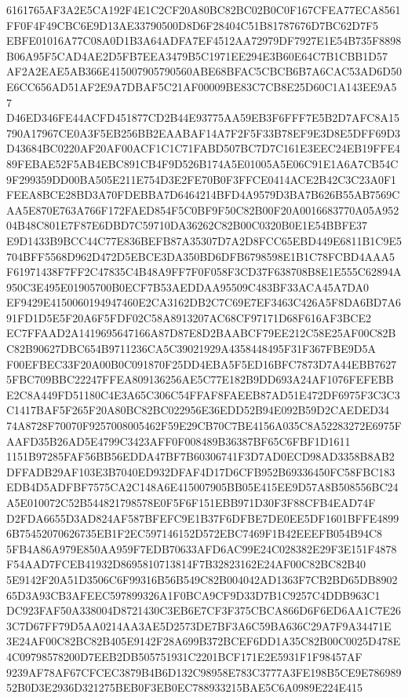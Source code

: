 \documentclass[UTF8,fontset=fandol,zihao=-4,a4paper]{ctexart}
\begin{document}
{{6161765AF3A2E5CA192F4E1C2CF20A80BC82BC02B0C0F167CFEA77ECA8561FF0F4F49CBC6E9D13AE33790500D8D6F28404C51B81787676D7BC62D7F5
EBFE01016A77C08A0D1B3A64ADFA7EF4512AA72979DF7927E1E54B735F8898B06A95F5CAD4AE2D5FB7EEA3479B5C1971EE294E3B60E64C7B1CBB1D57
AF2A2EAE5AB366E415007905790560ABE68BFAC5CBCB6B7A6CAC53AD6D50E6CC656AD51AF2E9A7DBAF5C21AF00009BE83C7CB8E25D60C1A143EE9A57
D46ED346FE44ACFD451877CD2B44E93775AA59EB3F6FFF7E5B2D7AFC8A15790A17967CE0A3F5EB256BB2EAABAF14A7F2F5F33B78EF9E3D8E5DFF69D3
D43684BC0220AF20AF00ACF1C1C71FABD507BC7D7C161E3EEC24EB19FFE489FEBAE52F5AB4EBC891CB4F9D526B174A5E01005A5E06C91E1A6A7CB54C
9F299359DD00BA505E211E754D3E2FE70B0F3FFCE0414ACE2B42C3C23A0F1FEEA8BCE28BD3A70FDEBBA7D6464214BFD4A9579D3BA7B626B55AB7569C
AA5E870E763A766F172FAED854F5C0BF9F50C82B00F20A0016683770A05A95204B48C801E7F87E6DBD7C59710DA36262C82B00C0320B0E1E54BBFE37
E9D1433B9BCC44C77E836BEFB87A35307D7A2D8FCC65EBD449E6811B1C9E5704BFF5568D962D472D5EBCE3DA350BD6DFB6798598E1B1C78FCBD4AAA5
F61971438F7FF2C47835C4B48A9FF7F0F058F3CD37F638708B8E1E555C62894A950C3E495E01905700B0ECF7B53AEDDAA95509C483BF33ACA45A7DA0
EF9429E4150060194947460E2CA3162DB2C7C69E7EF3463C426A5F8DA6BD7A691FD1D5E5F20A6F5FDF02C58A8913207AC68CF97171D68F616AF3BCE2
EC7FFAAD2A1419695647166A87D87E8D2BAABCF79EE212C58E25AF00C82BC82B90627DBC654B9711236CA5C39021929A4358448495F31F367FBE9D5A
F00EFBEC33F20A00B0C091870F25DD4EBA5F5ED16BFC7873D7A44EBB76275FBC709BBC22247FFEA809136256AE5C77E182B9DD693A24AF1076FEFEBB
E2C8A449FD51180C4E3A65C306C54FFAF8FAEEB87AD51E472DF6975F3C3C3C1417BAF5F265F20A80BC82BC022956E36EDD52B94E092B59D2CAEDED34
74A8728F70070F9257008005462F59E29CB70C7BE4156A035C8A52283272E6975FAAFD35B26AD5E4799C3423AFF0F008489B36387BF65C6FBF1D1611
1151B97285FAF56BB56EDDA47BF7B60306741F3D7AD0ECD98AD3358B8AB2DFFADB29AF103E3B7040ED932DFAF4D17D6CFB952B69336450FC58FBC183
EDB4D5ADFBF7575CA2C148A6E415007905BB05E415EE9D57A8B508556BC24A5E010072C52B544821798578E0F5F6F151EBB971D30F3F88CFB4EAD74F
D2FDA6655D3AD824AF587BFEFC9E1B37F6DFBE7DE0EE5DF1601BFFE48996B75452070626735EB1F2EC597146152D572EBC7469F1B42EEEFB054B94C8
5FB4A86A979E850AA959F7EDB70633AFD6AC99E24C028382E29F3E151F4878F54AAD7FCEB41932D8695810713814F7B32823162E24AF00C82BC82B40
5E9142F20A51D3506C6F99316B56B549C82B004042AD1363F7CB2BD65DB890265D3A93CB3AFEEC597899326A1F0BCA9CF9D33D7B1C9257C4DDB963C1
DC923FAF50A338004D8721430C3EB6E7CF3F375CBCA866D6F6ED6AA1C7E263C7D67FF79D5AA0214AA3AE5D2573DE7BF3A6C59BA636C29A7F9A34471E
3E24AF00C82BC82B405E9142F28A699B372BCEF6DD1A35C82B00C0025D478E4C09798578200D7EEB2DB505751931C2201BCF171E2E5931F1F98457AF
9239AF78AF67CFCEC3879B4B6D132C98958E783C3777A3FE198B5CE9E78698952B0D3E2936D321275BEB0F3EB0EC788933215BAE5C6A0989E224E415
}}
\end{document}
